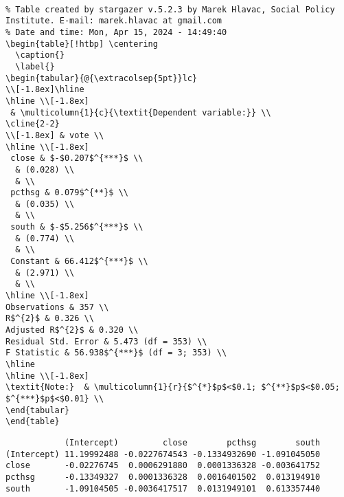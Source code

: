 \documentclass[
  letterpaper,
  DIV=11,
  numbers=noendperiod]{scrartcl}
\begin{document}
\begin{verbatim}

% Table created by stargazer v.5.2.3 by Marek Hlavac, Social Policy Institute. E-mail: marek.hlavac at gmail.com
% Date and time: Mon, Apr 15, 2024 - 14:49:40
\begin{table}[!htbp] \centering 
  \caption{} 
  \label{} 
\begin{tabular}{@{\extracolsep{5pt}}lc} 
\\[-1.8ex]\hline 
\hline \\[-1.8ex] 
 & \multicolumn{1}{c}{\textit{Dependent variable:}} \\ 
\cline{2-2} 
\\[-1.8ex] & vote \\ 
\hline \\[-1.8ex] 
 close & $-$0.207$^{***}$ \\ 
  & (0.028) \\ 
  & \\ 
 pcthsg & 0.079$^{**}$ \\ 
  & (0.035) \\ 
  & \\ 
 south & $-$5.256$^{***}$ \\ 
  & (0.774) \\ 
  & \\ 
 Constant & 66.412$^{***}$ \\ 
  & (2.971) \\ 
  & \\ 
\hline \\[-1.8ex] 
Observations & 357 \\ 
R$^{2}$ & 0.326 \\ 
Adjusted R$^{2}$ & 0.320 \\ 
Residual Std. Error & 5.473 (df = 353) \\ 
F Statistic & 56.938$^{***}$ (df = 3; 353) \\ 
\hline 
\hline \\[-1.8ex] 
\textit{Note:}  & \multicolumn{1}{r}{$^{*}$p$<$0.1; $^{**}$p$<$0.05; $^{***}$p$<$0.01} \\ 
\end{tabular} 
\end{table} 
\end{verbatim}

\begin{verbatim}
            (Intercept)         close        pcthsg        south
(Intercept) 11.19992488 -0.0227674543 -0.1334932690 -1.091045050
close       -0.02276745  0.0006291880  0.0001336328 -0.003641752
pcthsg      -0.13349327  0.0001336328  0.0016401502  0.013194910
south       -1.09104505 -0.0036417517  0.0131949101  0.613357440
\end{verbatim}
\end{document}

